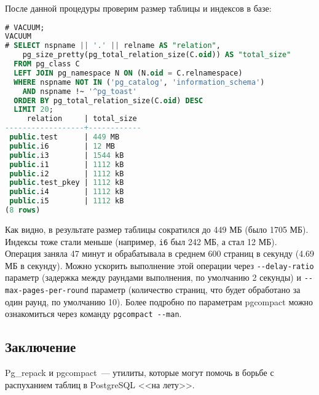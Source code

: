 После данной процедуры проверим размер таблицы и индексов в базе:

\begin{lstlisting}[language=SQL,label=lst:pgcompactor9,caption=Размер таблицы и индексов]
# VACUUM;
VACUUM
# SELECT nspname || '.' || relname AS "relation",
    pg_size_pretty(pg_total_relation_size(C.oid)) AS "total_size"
  FROM pg_class C
  LEFT JOIN pg_namespace N ON (N.oid = C.relnamespace)
  WHERE nspname NOT IN ('pg_catalog', 'information_schema')
    AND nspname !~ '^pg_toast'
  ORDER BY pg_total_relation_size(C.oid) DESC
  LIMIT 20;
     relation     | total_size
------------------+------------
 public.test      | 449 MB
 public.i6        | 12 MB
 public.i3        | 1544 kB
 public.i1        | 1112 kB
 public.i2        | 1112 kB
 public.test_pkey | 1112 kB
 public.i4        | 1112 kB
 public.i5        | 1112 kB
(8 rows)
\end{lstlisting}

Как видно, в результате размер таблицы сократился до 449 МБ (было 1705 МБ). Индексы тоже стали меньше (например, \lstinline!i6! был 242 МБ, а стал 12 МБ). Операция заняла 47 минут и обрабатывала в среднем 600 страниц в секунду (4.69 МБ в секунду). Можно ускорить выполнение этой операции через \lstinline!--delay-ratio! параметр (задержка между раундами выполнения, по умолчанию 2 секунды) и \lstinline!--max-pages-per-round! параметр (количество страниц, что будет обработано за один раунд, по умолчанию 10). Более подробно по параметрам pgcompact можно ознакомиться через команду \lstinline!pgcompact --man!.


\subsection{Заключение}

Pg\_repack и pgcompact~--- утилиты, которые могут помочь в борьбе с распуханием таблиц в PostgreSQL <<на лету>>.
